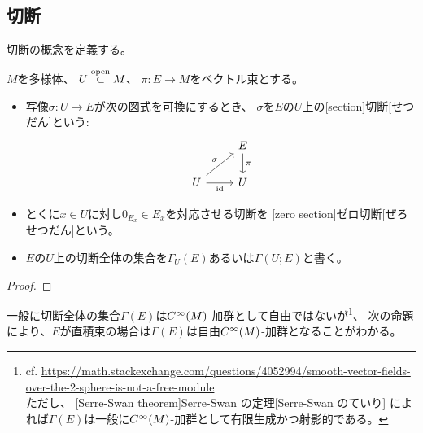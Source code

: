 \documentclass[report]{jlreq}
\begin{document}
\subsection{切断}

切断の概念を定義する。

\begin{definition}[切断]
    $M$を多様体、
    $U \stackrel{\text{open}}{\subset} M$、
    $\pi \colon E \to M$をベクトル束とする。
    \begin{itemize}
        \item {\smooth}写像$\sigma \colon U \to E$が次の図式を可換にするとき、
            $\sigma$を$E$の$U$上の[section]{切断}[せつだん]という:
            \begin{equation}
                \begin{tikzcd}
                    & E \ar{d}{\pi} \\
                    U \ar{ur}{\sigma} \ar{r}[swap]{\id} & U
                \end{tikzcd}
            \end{equation}
        \item とくに$x \in U$に対し$0_{E_x} \in E_x$を対応させる切断を
            [zero section]{ゼロ切断}[ぜろせつだん]という。
        \item $E$の$U$上の切断全体の集合を$\Gamma_U(E)$あるいは$\Gamma(U; E)$と書く。
    \end{itemize}
\end{definition}


\begin{proof}
    \TODO{}
\end{proof}

一般に切断全体の集合$\Gamma(E)$は$C^\infty(M)$-加群として自由ではないが\footnote{
    cf. \url{https://math.stackexchange.com/questions/4052994/smooth-vector-fields-over-the-2-sphere-is-not-a-free-module} \\
    ただし、
    [Serre-Swan theorem]{Serre-Swan の定理}[Serre-Swan のていり]
    によれば$\Gamma(E)$は一般に$C^\infty(M)$-加群として有限生成かつ射影的である。
}、
次の命題により、$E$が直積束の場合は$\Gamma(E)$は自由$C^\infty(M)$-加群となることがわかる。
\end{document}
